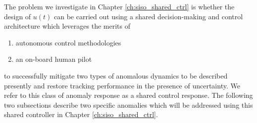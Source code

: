 The problem we investigate in Chapter \ref{ch:siso_shared_ctrl} is whether the design of $u(t)$ can be carried out using a shared decision-making and control architecture which leverages the merits of 
\begin{enumerate}[label=(\alph*)]
	\item autonomous control methodologies
	\item an on-board human pilot
\end{enumerate}
to successfully mitigate two types of anomalous dynamics to be described presently and restore tracking performance in the presence of uncertainty. We refer to this class of anomaly response as a shared control response. The following two subsections describe two specific anomalies which will be addressed using this shared controller in Chapter \ref{ch:siso_shared_ctrl}.

